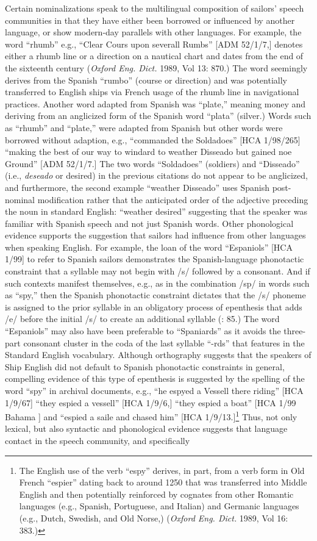    Certain nominalizations speak to the multilingual composition of sailors’ speech communities in that they have either been borrowed or influenced by another language, or show modern-day parallels with other languages. For example, the word “rhumb” e.g., “Clear Cours upon severall Rumbs” [ADM 52/1/7,] denotes either a rhumb line or a direction on a nautical chart and dates from the end of the sixteenth century (\textit{Oxford Eng. Dict.} 1989, Vol 13: 870.) The word seemingly derives from the Spanish “rumbo” (course or direction) and was potentially transferred to English ships via French usage of the rhumb line in navigational practices. Another word adapted from Spanish was “plate,” meaning money and deriving from an anglicized form of the Spanish word “plata” (silver.) Words such as “rhumb” and “plate,” were adapted from Spanish but other words were borrowed without adaption, e.g., “commanded the Soldadoes” [HCA 1/98/265] “making the best of our way to windard to weather Disseado but gained noe Ground” [ADM 52/1/7.] The two words “Soldadoes” (soldiers) and “Disseado” (i.e., \textit{deseado} or desired) in the previous citations do not appear to be anglicized, and furthermore, the second example “weather Disseado” uses Spanish post-nominal modification rather that the anticipated order of the adjective preceding the noun in standard English: “weather desired” suggesting that the speaker was familiar with Spanish speech and not just Spanish words. Other phonological evidence supports the suggestion that sailors had influence from other languages when speaking English. For example, the loan of the word “Espaniols” [HCA 1/99] to refer to Spanish sailors demonstrates the Spanish-language phonotactic constraint that a syllable may not begin with /s/ followed by a consonant. And if such contexts manifest themselves, e.g., as in the combination /sp/ in words such as “spy,” then the Spanish phonotactic constraint dictates that the /s/ phoneme is assigned to the prior syllable in an obligatory process of epenthesis that adds /e/ before the initial /s/ to create an additional syllable (\citealt{Schnitzer1997}: 85.) The word “Espaniols” may also have been preferable to “Spaniards” as it avoids the three-part consonant cluster in the coda of the last syllable “-rds” that features in the Standard English vocabulary. Although orthography suggests that the speakers of Ship English did not default to Spanish phonotactic constraints in general, compelling evidence of this type of epenthesis is suggested by the spelling of the word “spy” in archival documents, e.g., “he espyed a Vessell there riding” [HCA 1/9/67] “they espied a vessell” [HCA 1/9/6,] “they espied a boat” [HCA 1/99 Bahama \citealt{Islands1722}] and “espied a saile and chased him” [HCA 1/9/13.]\footnote{The English use of the verb “espy” derives, in part, from a verb form in Old French “espier” dating back to around 1250 that was transferred into Middle English and then potentially reinforced by cognates from other Romantic languages (e.g., Spanish, Portuguese, and Italian) and Germanic languages (e.g., Dutch, Swedish, and Old Norse,) (\textit{Oxford Eng. Dict.} 1989, Vol 16: 383.)} Thus, not only lexical, but also syntactic and phonological evidence suggests that language contact in the speech community, and specifically 